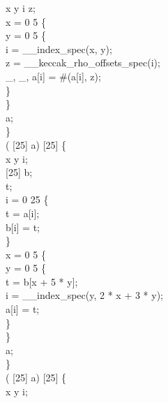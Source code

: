   x y i z;\\
 x = 0  5 \{\\
 y = 0  5 \{\\
i = __index_spec(x, y);\\
z = __keccak_rho_offsets_spec(i);\\
_, _, a[i] = \#(a[i], z);\\
\}\\
\}\\
 a;\\
\}\\
  ( [25] a) \jasminarrow{}  [25] \{\\
  x y i;\\
 [25] b;\\
  t;\\
 i = 0  25 \{\\
t = a[i];\\
b[i] = t;\\
\}\\
 x = 0  5 \{\\
 y = 0  5 \{\\
t = b[x + 5 * y];\\
i = __index_spec(y, 2 * x + 3 * y);\\
a[i] = t;\\
\}\\
\}\\
 a;\\
\}\\
  ( [25] a) \jasminarrow{}  [25] \{\\
  x y i;\\

